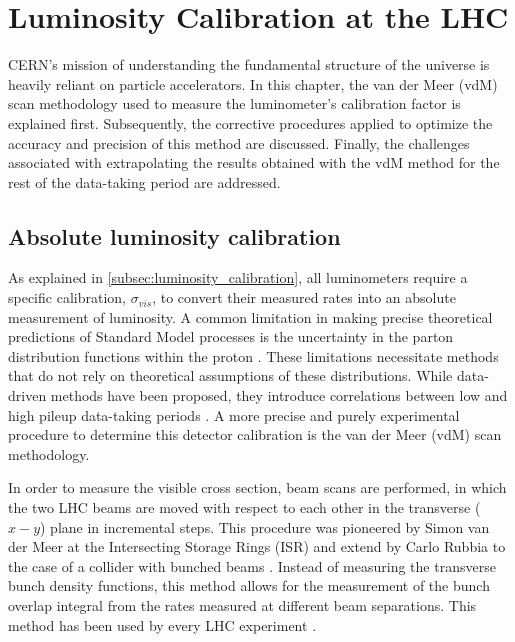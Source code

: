 \chapter{Luminosity Calibration at the LHC}

CERN’s mission of understanding the fundamental structure of the universe is heavily reliant on particle accelerators. In this chapter, the van der Meer (vdM) scan methodology used to measure the luminometer's calibration factor is explained first. Subsequently, the corrective procedures applied to optimize the accuracy and precision of this method are discussed. Finally, the challenges associated with extrapolating the results obtained with the vdM method for the rest of the data-taking period are addressed.
\section{Absolute luminosity calibration}
\label{sec:absolute_luminosity_calibration}

As explained in \autoref{subsec:luminosity_calibration}, all luminometers require a specific calibration, $\sigma_{vis}$, to convert their measured rates into an absolute measurement of luminosity. A common limitation in making precise theoretical predictions of Standard Model processes is the uncertainty in the parton distribution functions within the proton \cite{GRAFSTROM201597}. These limitations necessitate methods that do not rely on theoretical assumptions of these distributions. While data-driven methods have been proposed, they introduce correlations between low and high pileup data-taking periods \cite{Salfeld-Nebgen_2018}. A more precise and purely experimental procedure to determine this detector calibration is the van der Meer (vdM) scan methodology.

In order to measure the visible cross section, beam scans are performed, in which the two LHC beams are moved with respect to each other in the transverse ($x-y$) plane in incremental steps. This procedure was pioneered by Simon van der Meer at the Intersecting Storage Rings (ISR) \cite{vanderMeer:296752} and extend by Carlo Rubbia to the case of a collider with bunched beams \cite{Rubbia:1025746}. Instead of measuring the transverse bunch density functions, this method allows for the measurement of the bunch overlap integral from the rates measured at different beam separations. This method has been used by every LHC experiment \cite{TheLHCbcollaboration_2014, ALICE-PUBLIC-2021-001, Maettig:1513982, Sirunyan:2759951}.

